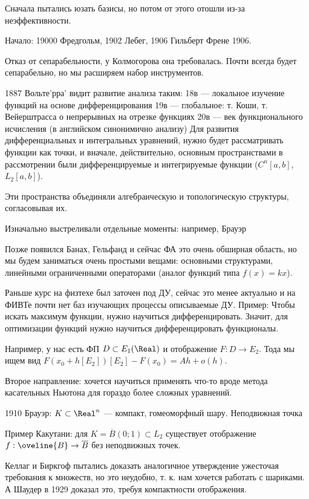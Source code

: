 

Сначала пытались юзать базисы, но потом от этого отошли из-за
неэффективности.

Начало:
19000 Фредгольм, 1902 Лебег, 1906 Гильберт Френе 1906.

Отказ от сепарабельности, у Колмогорова она требовалась.
Почти всегда будет сепарабельно, но мы расширяем набор инструментов.

1887 Вольте’рра’ видит развитие анализа таким:
18в — локальное изучение функций на основе дифференцирования
19в — глобальное: т. Коши, т. Вейерштрасса о непрерывных на отрезке функциях
20в — век функционального исчисления (в английском синонимично анализу)
Для развития дифференциальных и интегральных уравнений, нужно будет рассматривать функции как точки,
и вначале, действительно, основным пространствами в рассмотрении были дифференцируемые
и интегрируемые функции ($C^n[a, b]$, $L_2[a, b]$).

Эти пространства объединяли алгебраическую и топологическую структуры, согласовывая их.

Изначально выстреливали отдельные моменты: например, Брауэр

Позже появился Банах, Гельфанд и сейчас ФА это очень обширная область,
но мы будем заниматься очень простыми вещами: основными структурами,
линейными ограниченными операторами (аналог функций типа $f(x) = kx$).

Раньше курс на физтехе был заточен под ДУ, сейчас это менее актуально
и на ФИВТе почти нет баз изучающих процессы описываемые ДУ.
Пример: Чтобы искать максимум функции, нужно научиться дифференцировать.
Значит, для оптимизации функций нужно научиться дифференцировать функционалы.

Например, у нас есть ФП $D \subset E_1(\Real)$ и отображение $F : D \to E_2$.
Тода мы ищем вид $F(x_0 + h[E_2])[E_2] - F(x_0) = A h + o(h)$.

Второе направление: хочется научиться применять что-то вроде метода касательных Ньютона
для гораздо более сложных уравнений.

1910 Брауэр: $K \subset \Real^n$ — компакт, гомеоморфный шару.
Неподвижная точка

Пример Какутани: для $K = \overline{B}(0; 1) \subset L_2$ существует
отображение $f : \oveline{B} \to \overline{B}$ без неподвижных точек.

Келлаг и Биркгоф пытались доказать аналогичное утверждение
ужесточая требования к множеств, но это неудобно, т. к. нам хочется
работать с шариками.
А Шаудер в 1929 доказал это, требуя компактности отображения.

